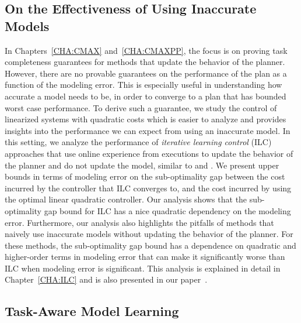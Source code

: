 \subsection{On the Effectiveness of Using Inaccurate Models}
\label{sec:effect-using-inacc}

In Chapters~\ref{CHA:CMAX} and~\ref{CHA:CMAXPP}, the focus is on proving task
completeness guarantees for methods that update the behavior of the planner.
However, there are no provable guarantees on the performance of the plan as a
function of the modeling error. This is especially useful in understanding how
accurate a model needs to be, in order to converge to a plan that has bounded
worst case performance. To derive such a guarantee, we study the control of
linearized systems with quadratic costs which is easier to analyze and provides insights
into the performance we can expect from using an inaccurate model. In this
setting, we analyze the performance of \textit{iterative learning control} (ILC)
approaches that use online experience from executions to update the behavior of
the planner and do not update the model, similar to \cmax{} and \cmaxpp{}. We
present upper bounds in terms of modeling error on the sub-optimality gap between the cost incurred by the
controller that ILC converges to, and the cost incurred by using the optimal
linear quadratic controller. Our analysis shows that the sub-optimality gap
bound for ILC has a nice quadratic dependency on the modeling error. Furthermore, our
analysis also highlights the
pitfalls of methods that naively use inaccurate models without updating the
behavior of the planner. For these methods, the sub-optimality gap bound has a
dependence on quadratic and higher-order terms in modeling error that can make it
significantly worse than ILC when modeling error is significant. This analysis
is explained in detail in Chapter~\ref{CHA:ILC} and is also presented in our
paper~\cite{ilc}.

\subsection{Task-Aware Model Learning}
\label{sec:task-aware-model}

